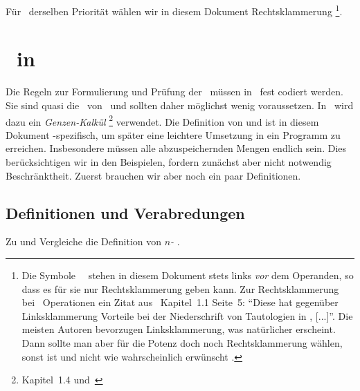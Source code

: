 Für \Operationen\ derselben Priorität wählen wir in diesem Dokument Rechtsklammerung%
\footnote{%
	Die Symbole \unaerer\ \Operationen\ stehen in diesem Dokument stets links \emph{vor} dem Operanden, so dass es für sie nur Rechtsklammerung geben kann.
	Zur Rechtsklammerung bei \binaeren\ Operationen ein Zitat aus~\cite{bib:Rautenberg} Kapitel~1.1 Seite~5:
	"`Diese hat gegenüber Linksklammerung Vorteile bei der Niederschrift von Tautologien in \OjkImp, [...]"'.
	Die meisten Autoren bevorzugen Linksklammerung, was natürlicher erscheint.
	Dann sollte man aber für die Potenz doch noch Rechtsklammerung wählen, sonst ist  und nicht wie wahrscheinlich erwünscht .
}.

\section[Beweise in ASBA]{\Beweise\ in \ASBA}%
\label                {sec-BeweiseASBA}

Die Regeln zur Formulierung und Prüfung der \Beweise\ müssen in \ASBA\ fest codiert werden.
Sie sind quasi die \Axiome\ von \ASBA\ und sollten daher möglichst wenig voraussetzen.
In \ASBA\ wird dazu ein \emph{Genzen-Kalkül}%
\footnote{%
	 Kapitel~1.4 und~\cite{bib:Schlussregel,bib:NatuerlichesSchliessen}
} verwendet.
Die Definition von \emph{\Schlussregel} und \emph{\Beweis} ist in diesem Dokument \ASBA-spezifisch, um später eine leichtere Umsetzung in ein Programm zu erreichen.
Insbesondere müssen alle abzuspeichernden Mengen endlich sein.
Dies berücksichtigen wir in den Beispielen, fordern zunächst aber nicht notwendig Beschränktheit.
Zuerst brauchen wir aber noch ein paar Definitionen.

\subsection{Definitionen und Verabredungen}%
\label                  {sub-Verabredungen}

Zu \chrqt{\MtsLen} und \chrqt{\MtsSet} Vergleiche die Definition von \emph{$n$-\Tupel} .

